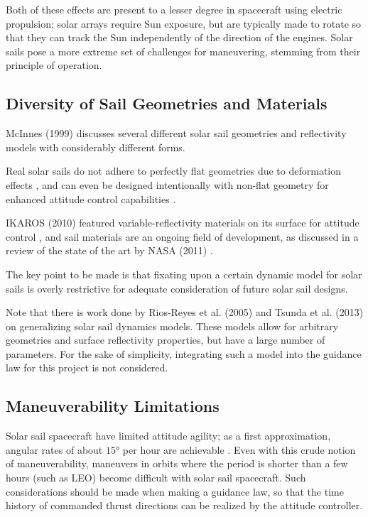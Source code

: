 Both of these effects are present to a lesser degree in spacecraft using electric propulsion; solar arrays require Sun exposure, but are typically made to rotate so that they can track the Sun independently of the direction of the engines. Solar sails pose a more extreme set of challenges for maneuvering, stemming from their principle of operation.

\subsection{Diversity of Sail Geometries and Materials}
McInnes (1999) \cite{mcinnes} discusses several different solar sail geometries and reflectivity models with considerably different forms.

Real solar sails do not adhere to perfectly flat geometries due to deformation effects \cite{sakamoto2006effect}, and can even be designed intentionally with non-flat geometry for enhanced attitude control capabilities \cite{felicetti2016attitude}.

IKAROS (2010) featured variable-reflectivity materials on its surface for attitude control \cite{tsuda2013achievement}, and sail materials are an ongoing field of development, as discussed in a review of the state of the art by NASA (2011) \cite{johnson2011status}.

The key point to be made is that fixating upon a certain dynamic model for solar sails is overly restrictive for adequate consideration of future solar sail designs.

Note that there is work done by Rios-Reyes et al. (2005) \cite{rios2005generalized} and Tsunda et al. (2013) \cite{tsuda2013generalized} on generalizing solar sail dynamics models. These models allow for arbitrary geometries and surface reflectivity properties, but have a large number of parameters. For the sake of simplicity, integrating such a model into the guidance law for this project is not considered.

\subsection{Maneuverability Limitations}
Solar sail spacecraft have limited attitude agility; as a first approximation, angular rates of about $\ang{15}$ per hour are achievable \cite{choi2015structural}. Even with this crude notion of maneuverability, maneuvers in orbits where the period is shorter than a few hours (such as LEO) become difficult with solar sail spacecraft. Such considerations should be made when making a guidance law, so that the time history of commanded thrust directions can be realized by the attitude controller.

